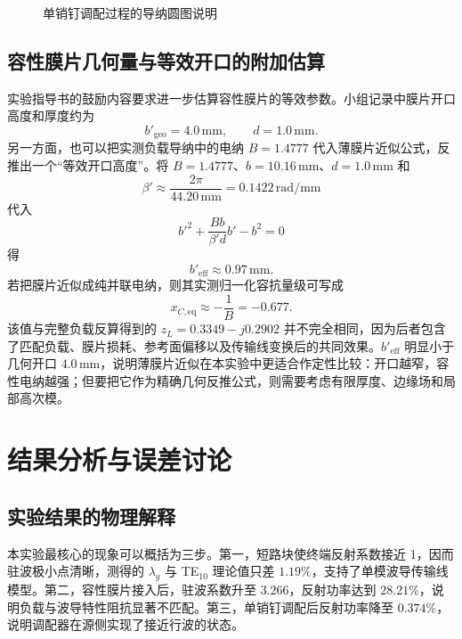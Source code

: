 \documentclass[UTF8]{ctexart}
\begin{document}
\begin{figure}[H]
  \centering
  \drawadmittancematchchart
  \caption{单销钉调配过程的导纳圆图说明}
  \label{fig:admittance-match}
\end{figure}

\subsection{容性膜片几何量与等效开口的附加估算}

实验指导书的鼓励内容要求进一步估算容性膜片的等效参数。小组记录中膜片开口高度和厚度约为
\[
  b'_\mathrm{geo}=4.0\,\mathrm{mm},\qquad d=1.0\,\mathrm{mm}.
\]
另一方面，也可以把实测负载导纳中的电纳 $B=1.4777$ 代入薄膜片近似公式，反推出一个“等效开口高度”。将 $B=1.4777$、$b=10.16\,\mathrm{mm}$、$d=1.0\,\mathrm{mm}$ 和
\[
  \beta'\approx\frac{2\pi}{44.20\,\mathrm{mm}}=0.1422\,\mathrm{rad/mm}
\]
代入
\begin{equation}
  b'^2+\frac{Bb}{\beta' d}b'-b^2=0
  \label{eq:bprime}
\end{equation}
得
\begin{equation}
  b'_\mathrm{eff}\approx0.97\,\mathrm{mm}.
\end{equation}
若把膜片近似成纯并联电纳，则其实测归一化容抗量级可写成
\begin{equation}
  x_{C,\mathrm{eq}}\approx-\frac{1}{B}=-0.677.
\end{equation}
该值与完整负载反算得到的 $z_L=0.3349-j0.2902$ 并不完全相同，因为后者包含了匹配负载、膜片损耗、参考面偏移以及传输线变换后的共同效果。$b'_\mathrm{eff}$ 明显小于几何开口 $4.0\,\mathrm{mm}$，说明薄膜片近似在本实验中更适合作定性比较：开口越窄，容性电纳越强；但要把它作为精确几何反推公式，则需要考虑有限厚度、边缘场和局部高次模。

\section{结果分析与误差讨论}

\subsection{实验结果的物理解释}

本实验最核心的现象可以概括为三步。第一，短路块使终端反射系数接近 1，因而驻波极小点清晰，测得的 $\lambda_g$ 与 TE$_{10}$ 理论值只差 $1.19\%$，支持了单模波导传输线模型。第二，容性膜片接入后，驻波系数升至 $3.266$，反射功率达到 $28.21\%$，说明负载与波导特性阻抗显著不匹配。第三，单销钉调配后反射功率降至 $0.374\%$，说明调配器在源侧实现了接近行波的状态。
\end{document}
